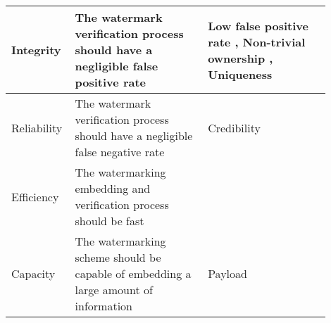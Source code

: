 \begin{table}
\begin{tabular}{|p{0.13 \linewidth}|p{0.40 \linewidth}|p{0.37 \linewidth}|}
%
Integrity                       & The watermark verification process should have a negligible false positive rate                                   & Low false positive rate \cite{guo_evolutionary_2019, guo_watermarking_2018}, Non-trivial ownership \cite{li_piracy_2020, adi_turning_2018, wang_robust_2020}, Uniqueness \cite{quan_watermarking_2020} \\ \hline
%
Reliability                     & The watermark verification process should have a negligible false negative rate                                   & Credibility \cite{chen_blackmarks_2019}                                                \\ \hline
%
Efficiency                      & The watermarking embedding and verification process should be fast                                                &                                                            \\ \hline
%
Capacity                        & The watermarking scheme should be capable of embedding a large amount of information                              & Payload \cite{guo_watermarking_2018}                                                    \\ \hline
%



\end{tabular}
\end{table}
